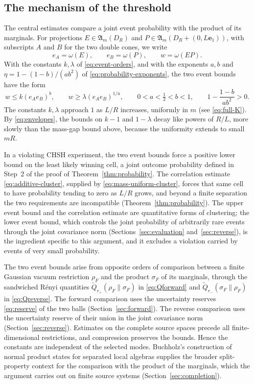 \documentclass[11pt]{amsart}
\numberwithin{equation}{section}
\theoremstyle{definition}
\newcommand{\A}{\mathfrak A}
\newcommand{\Qtil}{\widetilde Q}
\newcommand{\eone}{\mathbf e_1}
\begin{document}
\subsection{The mechanism of the threshold}

The central estimates compare a joint event probability with the
product of its marginals. For projections \(E\in\A_m(D_R)\) and \(P\in\A_m(D_R+(0,L\eone))\), with
subscripts \(A\) and \(B\) for the two double cones, we write
\[
 e_A=\omega(E),\qquad e_B=\omega(P),\qquad w=\omega(EP).
\]
With the constants \(k,\lambda\) of \eqref{eq:event-orders}, and with the
exponents \(a,b\) and \(\eta=1-(1-b)/(ab^2)\) of
\eqref{eq:probability-exponents}, the two event bounds have the form
\[
 w\le k(e_Ae_B)^b,\qquad
 w\ge\lambda(e_Ae_B)^{1/a},\qquad
 0<a<\tfrac12<b<1,
 \qquad
 1-\frac{1-b}{ab^2}>0.
\]
The constants \(k,\lambda\) approach \(1\) as \(L/R\) increases,
uniformly in \(m\) (see \eqref{eq:full-K}). By \eqref{eq:envelopes}, the
bounds on \(k-1\) and \(1-\lambda\) decay like powers of \(R/L\), more slowly
than the mass-gap bound above, because the uniformity extends to small
\(mR\).

In a violating CHSH experiment, the two event
bounds force a positive lower bound on the least likely winning cell, a joint outcome probability defined in
Step~2 of the proof of Theorem~\ref{thm:probability}.
The correlation estimate \eqref{eq:additive-cluster}, supplied by
\eqref{eq:mass-uniform-cluster}, forces that same cell to have probability
tending to zero as \(L/R\) grows, and beyond a finite separation the two
requirements are incompatible (Theorem~\ref{thm:probability}).
The upper event bound and the correlation estimate are quantitative
forms of clustering; the lower event bound, which controls the joint
probability of arbitrarily rare events through the joint covariance
norm (Sections~\ref{sec:evaluation} and~\ref{sec:reverse}), is the
ingredient specific to this argument, and it excludes a
violation carried by events of very small probability.

The two event bounds arise from opposite orders of comparison between a
finite Gaussian vacuum restriction \(\rho_F\) and the product \(\sigma_F\) of
its marginals, through the sandwiched Rényi quantities
\(\Qtil_{r_+}(\rho_F\|\sigma_F)\) in \eqref{eq:Qforward} and
\(\Qtil_{r_-}(\sigma_F\|\rho_F)\) in \eqref{eq:Qreverse}.
The forward comparison uses the uncertainty reserves \eqref{eq:reserve}
of the two balls (Section~\ref{sec:forward}). The reverse comparison uses
the uncertainty reserve of their union in the joint covariance norm
(Section~\ref{sec:reverse}). Estimates on the complete source spaces precede
all finite-dimensional restrictions, and compression preserves the
bounds. Hence the constants are independent of the
selected modes. Buchholz's construction of normal product states for
separated local algebras \cite{Buchholz74} supplies the broader
split-property context for the comparison with the product of the
marginals, which the argument carries out on finite source systems
(Section~\ref{sec:completion}).
\end{document}
